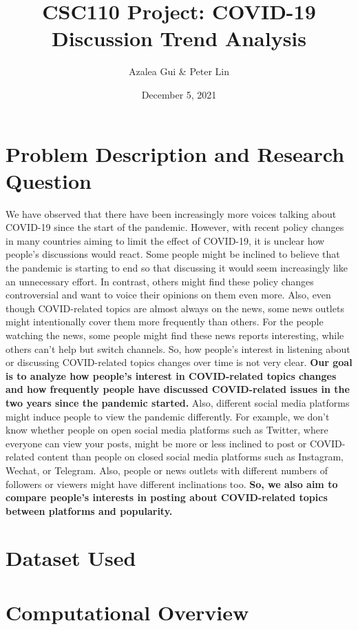 \documentclass{article}
\title{CSC110 Project: COVID-19 Discussion Trend Analysis}
\author{Azalea Gui \& Peter Lin}
\date{December 5, 2021}
\begin{document}
    \maketitle

    \section*{Problem Description and Research Question}
    \indent

    We have observed that there have been increasingly more voices talking about COVID-19 since the start of the pandemic. However, with recent policy changes in many countries aiming to limit the effect of COVID-19, it is unclear how people’s discussions would react. Some people might be inclined to believe that the pandemic is starting to end so that discussing it would seem increasingly like an unnecessary effort. In contrast, others might find these policy changes controversial and want to voice their opinions on them even more. Also, even though COVID-related topics are almost always on the news, some news outlets might intentionally cover them more frequently than others. For the people watching the news, some people might find these news reports interesting, while others can’t help but switch channels. So, how people’s interest in listening about or discussing COVID-related topics changes over time is not very clear. \textbf{Our goal is to analyze how people’s interest in COVID-related topics changes and how frequently people have discussed COVID-related issues in the two years since the pandemic started.} Also, different social media platforms might induce people to view the pandemic differently. For example, we don’t know whether people on open social media platforms such as Twitter, where everyone can view your posts, might be more or less inclined to post or COVID-related content than people on closed social media platforms such as Instagram, Wechat, or Telegram. Also, people or news outlets with different numbers of followers or viewers might have different inclinations too. \textbf{So, we also aim to compare people’s interests in posting about COVID-related topics between platforms and popularity.}

    \section*{Dataset Used}
    \indent

    
    
    \section*{Computational Overview}
\end{document}
